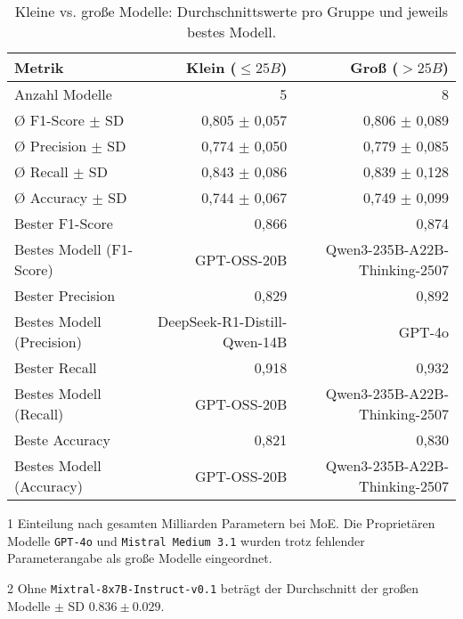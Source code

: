 \begin{table}[htbp]
 \centering
 \caption{Kleine vs. große Modelle: Durchschnittswerte pro Gruppe und jeweils bestes Modell.}
 \label{tab:small-vs-large}
 \begin{adjustbox}{width=\textwidth}
  \begin{threeparttable}[width=\textwidth]
   \begin{tabular}[width=\textwidth]{l r r}
    \toprule
    \textbf{Metrik} & \textbf{Klein} ($\leq 25B$) & \textbf{Groß} ($> 25B$) \\
    \midrule
    Anzahl Modelle\tnote{1}             & 5                         & 8 \\
    Ø F1-Score $\pm$ SD\tnote{2}      & 0,805 $\pm$ 0,057                     & 0,806 $\pm$ 0,089 \\
    Ø Precision $\pm$ SD    & 0,774 $\pm$ 0,050                     & 0,779 $\pm$ 0,085 \\
    Ø Recall $\pm$ SD       & 0,843 $\pm$ 0,086                     & 0,839 $\pm$ 0,128 \\
    Ø Accuracy $\pm$ SD     & 0,744 $\pm$ 0,067                     & 0,749 $\pm$ 0,099 \\
    Bester F1-Score & 0,866                     & 0,874 \\
    Bestes Modell (F1-Score)   & GPT-OSS-20B               & Qwen3-235B-A22B-Thinking-2507 \\
    Bester Precision & 0,829                     & 0,892 \\
    Bestes Modell (Precision) & DeepSeek-R1-Distill-Qwen-14B        & GPT-4o \\
    Bester Recall & 0,918                     & 0,932 \\
    Bestes Modell (Recall)      & GPT-OSS-20B      & Qwen3-235B-A22B-Thinking-2507 \\
    Beste Accuracy & 0,821                     & 0,830 \\
    Bestes Modell (Accuracy)     & GPT-OSS-20B               & Qwen3-235B-A22B-Thinking-2507 \\
    \bottomrule
   \end{tabular}
   \begin{tablenotes}
    \footnotesize
    \item[1] Einteilung nach gesamten Milliarden Parametern bei \ac{MoE}. Die Proprietären Modelle \texttt{GPT-4o} und \texttt{Mistral Medium 3.1} wurden trotz fehlender Parameterangabe als große Modelle eingeordnet.
    \item[2] Ohne \texttt{Mixtral-8x7B-Instruct-v0.1} beträgt der Durchschnitt der großen Modelle $\pm$ SD $0.836 \pm 0.029$.
   \end{tablenotes}
  \end{threeparttable}
 \end{adjustbox}
\end{table}

